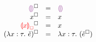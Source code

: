 \newcommand{\erasesToRow}[2]{\erase{#1} & = & #2}
\begin{figure}[htbp]
  \[\begin{array}{rcl}
    \erasesToRow{\ECEHole}{\EEHole} \\
    \erasesToRow{x}{x} \\
    \erasesToRow{\ECFree{x}}{x} \\
    \erasesToRow{(\ECLam{x}{\TMV}{\ECMV})}{\ELam{x}{\TMV}{(\erase{\ECMV})}} \\

\end{array}\]
\end{figure}
